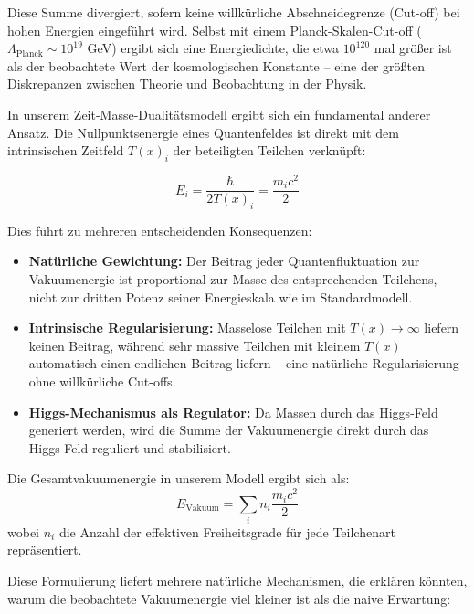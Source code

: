 \documentclass[a4paper,12pt]{article}
\newcommand{\Tfield}{T(x)} %
\begin{document}
	Diese Summe divergiert, sofern keine willkürliche Abschneidegrenze (Cut-off) bei hohen Energien eingeführt wird. Selbst mit einem Planck-Skalen-Cut-off ($\Lambda_{\text{Planck}} \sim 10^{19}$ GeV) ergibt sich eine Energiedichte, die etwa $10^{120}$ mal größer ist als der beobachtete Wert der kosmologischen Konstante – eine der größten Diskrepanzen zwischen Theorie und Beobachtung in der Physik.
	
	In unserem Zeit-Masse-Dualitätsmodell ergibt sich ein fundamental anderer Ansatz. Die Nullpunktsenergie eines Quantenfeldes ist direkt mit dem intrinsischen Zeitfeld $\Tfield_i$ der beteiligten Teilchen verknüpft:
	
	\begin{equation}
		E_i = \frac{\hbar}{2\Tfield_i} = \frac{m_i c^2}{2}
	\end{equation}
	
	Dies führt zu mehreren entscheidenden Konsequenzen:
	
	\begin{itemize}
		\item \textbf{Natürliche Gewichtung:} Der Beitrag jeder Quantenfluktuation zur Vakuumenergie ist proportional zur Masse des entsprechenden Teilchens, nicht zur dritten Potenz seiner Energieskala wie im Standardmodell.
		
		\item \textbf{Intrinsische Regularisierung:} Masselose Teilchen mit $\Tfield \to \infty$ liefern keinen Beitrag, während sehr massive Teilchen mit kleinem $\Tfield$ automatisch einen endlichen Beitrag liefern – eine natürliche Regularisierung ohne willkürliche Cut-offs.
		
		\item \textbf{Higgs-Mechanismus als Regulator:} Da Massen durch das Higgs-Feld generiert werden, wird die Summe der Vakuumenergie direkt durch das Higgs-Feld reguliert und stabilisiert.
	\end{itemize}
	
	Die Gesamtvakuumenergie in unserem Modell ergibt sich als:
	\begin{equation}
		E_{\text{Vakuum}} = \sum_i n_i \frac{m_i c^2}{2}
	\end{equation}
	wobei $n_i$ die Anzahl der effektiven Freiheitsgrade für jede Teilchenart repräsentiert.
	
	Diese Formulierung liefert mehrere natürliche Mechanismen, die erklären könnten, warum die beobachtete Vakuumenergie viel kleiner ist als die naive Erwartung:
	
\end{document}
